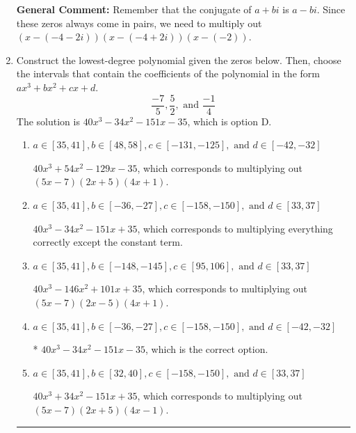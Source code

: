 \documentclass{extbook}[14pt]
\newcommand{\litem}[1]{\item #1

\rule{\textwidth}{0.4pt}}
\begin{document}
\begin{enumerate}
{\textbf{General Comment:} Remember that the conjugate of $a+bi$ is $a-bi$. Since these zeros always come in pairs, we need to multiply out $(x-(-4 - 2 i))(x-(-4 + 2 i))(x-(-2))$.
}
\litem{
Construct the lowest-degree polynomial given the zeros below. Then, choose the intervals that contain the coefficients of the polynomial in the form $ax^3+bx^2+cx+d$.
\[ \frac{-7}{5}, \frac{5}{2}, \text{ and } \frac{-1}{4} \]The solution is \( 40x^{3} -34 x^{2} -151 x -35 \), which is option D.\begin{enumerate}[label=\Alph*.]
\item \( a \in [35, 41], b \in [48, 58], c \in [-131, -125], \text{ and } d \in [-42, -32] \)

$40x^{3} +54 x^{2} -129 x -35$, which corresponds to multiplying out $(5x -7)(2x + 5)(4x + 1)$.
\item \( a \in [35, 41], b \in [-36, -27], c \in [-158, -150], \text{ and } d \in [33, 37] \)

$40x^{3} -34 x^{2} -151 x + 35$, which corresponds to multiplying everything correctly except the constant term.
\item \( a \in [35, 41], b \in [-148, -145], c \in [95, 106], \text{ and } d \in [33, 37] \)

$40x^{3} -146 x^{2} +101 x + 35$, which corresponds to multiplying out $(5x -7)(2x -5)(4x + 1)$.
\item \( a \in [35, 41], b \in [-36, -27], c \in [-158, -150], \text{ and } d \in [-42, -32] \)

* $40x^{3} -34 x^{2} -151 x -35$, which is the correct option.
\item \( a \in [35, 41], b \in [32, 40], c \in [-158, -150], \text{ and } d \in [33, 37] \)

$40x^{3} +34 x^{2} -151 x + 35$, which corresponds to multiplying out $(5x -7)(2x + 5)(4x -1)$.
\end{enumerate}

}
\end{enumerate}
\end{document}
